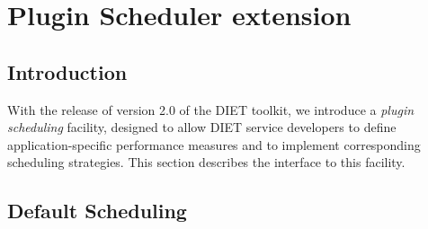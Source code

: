 

\newenvironment{code}
{\begin{list}{}{\setlength{\leftmargin}{1em}}\item\bfseries\tt}
{\end{list}}

\newenvironment{tinycode}
{\begin{list}{}{\setlength{\leftmargin}{1em}}\item\tiny\bfseries\tt}
{\end{list}}


\chapter{Plugin Scheduler extension}
\label{ch:plugin}

\section{Introduction}

With the release of version 2.0 of the DIET toolkit, we introduce a
\emph{plugin scheduling} facility, designed to allow DIET service
developers to define application-specific performance measures and
to implement corresponding scheduling strategies.  This section
describes the interface to this facility.

\section{Default Scheduling}

